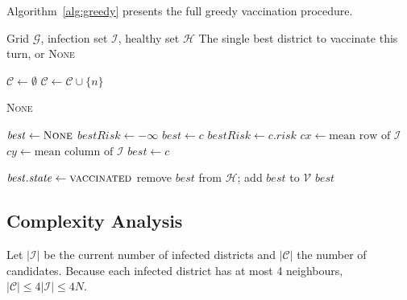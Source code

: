 \documentclass[conference]{IEEEtran}
\begin{document}
Algorithm~\ref{alg:greedy} presents the full greedy vaccination procedure.

\begin{algorithm}[ht]
\caption{Greedy Vaccination}
\label{alg:greedy}
\begin{algorithmic}[1]
\REQUIRE Grid $\mathcal{G}$, infection set $\mathcal{I}$, healthy set $\mathcal{H}$
\ENSURE The single best district to vaccinate this turn, or \textsc{None}

\STATE $\mathcal{C} \leftarrow \emptyset$
      \STATE $\mathcal{C} \leftarrow \mathcal{C} \cup \{n\}$
    \ENDIF
  \ENDFOR
\ENDFOR

  \RETURN \textsc{None} 
\ENDIF

\STATE $\mathit{best} \leftarrow \textsc{None}$
\STATE $\mathit{bestRisk} \leftarrow -\infty$
    \STATE $\mathit{best} \leftarrow c$
    \STATE $\mathit{bestRisk} \leftarrow c.\mathit{risk}$
    \STATE $\mathit{cx} \leftarrow \text{mean row of } \mathcal{I}$
    \STATE $\mathit{cy} \leftarrow \text{mean column of } \mathcal{I}$
      \STATE $\mathit{best} \leftarrow c$
    \ENDIF
  \ENDIF
\ENDFOR

\STATE $\mathit{best}.\mathit{state} \leftarrow \textsc{vaccinated}$
\STATE remove $\mathit{best}$ from $\mathcal{H}$; add $\mathit{best}$ to $\mathcal{V}$
\RETURN $\mathit{best}$
\end{algorithmic}
\end{algorithm}

\subsection{Complexity Analysis}

Let $|\mathcal{I}|$ be the current number of infected districts and
$|\mathcal{C}|$ the number of candidates. Because each infected district has at most
4 neighbours, $|\mathcal{C}| \le 4|\mathcal{I}| \le 4N$.
\end{document}
